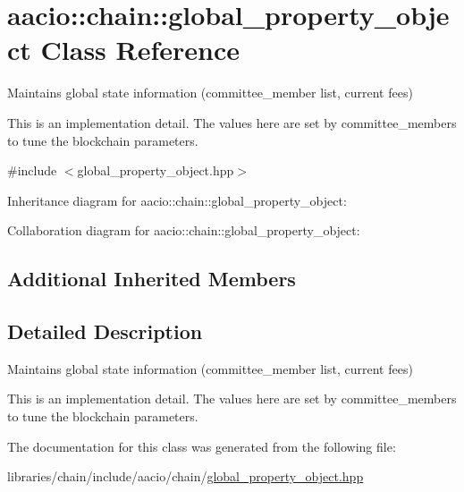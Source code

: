 \hypertarget{classaacio_1_1chain_1_1global__property__object}{}\section{aacio\+:\+:chain\+:\+:global\+\_\+property\+\_\+object Class Reference}
\label{classaacio_1_1chain_1_1global__property__object}


Maintains global state information (committee\+\_\+member list, current fees)

This is an implementation detail. The values here are set by committee\+\_\+members to tune the blockchain parameters.  




{\ttfamily \#include $<$global\+\_\+property\+\_\+object.\+hpp$>$}



Inheritance diagram for aacio\+:\+:chain\+:\+:global\+\_\+property\+\_\+object\+:


Collaboration diagram for aacio\+:\+:chain\+:\+:global\+\_\+property\+\_\+object\+:
\subsection*{Additional Inherited Members}


\subsection{Detailed Description}
Maintains global state information (committee\+\_\+member list, current fees)

This is an implementation detail. The values here are set by committee\+\_\+members to tune the blockchain parameters. 

The documentation for this class was generated from the following file\+:\begin{DoxyCompactItemize}
\item 
libraries/chain/include/aacio/chain/\mbox{\hyperlink{global__property__object_8hpp}{global\+\_\+property\+\_\+object.\+hpp}}\end{DoxyCompactItemize}
